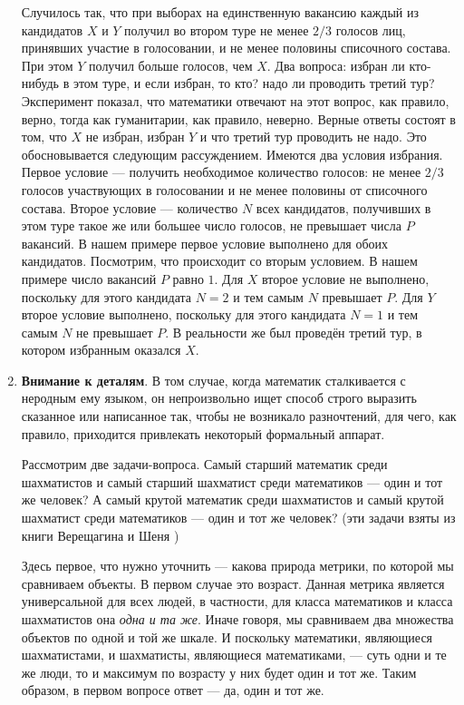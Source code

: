 \begin{enumerate}
Случилось так, что при выборах на единственную вакансию
каждый из кандидатов $X$ и $Y$ получил во втором туре не менее
$2/3$ голосов лиц, принявших участие в голосовании, и не менее
половины списочного состава. При этом $Y$ получил больше голосов, чем $X$. Два вопроса: избран ли кто-нибудь в этом туре, и если
избран, то кто? надо ли проводить третий тур? Эксперимент показал, что математики отвечают на этот вопрос, как правило,
верно, тогда как гуманитарии, как правило, неверно. Верные ответы состоят в том, что $X$ не избран, избран $Y$ и что третий тур
проводить не надо. Это обосновывается следующим рассуждением. Имеются два условия избрания. Первое условие --- получить
необходимое количество голосов: не менее $2/3$ голосов участвующих в голосовании и не менее половины от списочного состава. Второе условие --- количество $N$ всех кандидатов, получивших
в этом туре такое же или большее число голосов, не превышает
числа $P$ вакансий. В нашем примере первое условие выполнено
для обоих кандидатов. Посмотрим, что происходит со вторым
условием. В нашем примере число вакансий $P$ равно $1$. Для $X$ второе условие не выполнено, поскольку для этого кандидата $N = 2$
и тем самым $N$ превышает $P$. Для $Y$ второе условие выполнено,
поскольку для этого кандидата $N = 1$ и тем самым $N$ не превышает $P$. В реальности же был проведён третий тур, в котором
избранным оказался $X$.

\item \textbf{Внимание к деталям}. В том случае, когда математик сталкивается с неродным ему языком, он непроизвольно ищет способ строго выразить сказанное или написанное так, чтобы не возникало разночтений, для чего, как правило, приходится привлекать некоторый формальный аппарат.

Рассмотрим две задачи-вопроса. Самый старший математик среди шахматистов и самый старший шахматист среди математиков --- один и тот же человек? А самый крутой математик среди шахматистов и самый крутой шахматист среди математиков --- один и тот же человек? (эти задачи взяты из книги Верещагина и Шеня \cite{Vereschagin})

Здесь первое, что нужно уточнить --- какова природа метрики, по которой мы сравниваем объекты. В первом случае это возраст. Данная метрика является универсальной для всех людей, в частности, для класса математиков и класса шахматистов она \textit{одна и та же}. Иначе говоря, мы сравниваем два множества объектов по одной и той же шкале. И поскольку математики, являющиеся шахматистами, и шахматисты, являющиеся математиками, --- суть одни и те же люди, то и максимум по возрасту у них будет один и тот же. Таким образом, в первом вопросе ответ --- да, один и тот же.


\end{enumerate}
